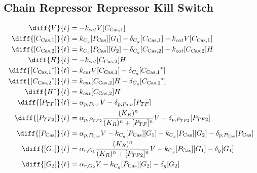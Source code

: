 \subsection{Chain Repressor Repressor Kill Switch}
\label{s:Chain_Repressor_Repressor_Kill_Switch}

\begin{align}
\diff{\vectorGen{}}{t} & = - \casCutRate{{}}\vectorGen{}\conc{\cplx{\cas}{1}}\\
\diff{\conc{\cplx{\cas}{1}}}{t} & =  \gRnaBind{}\conc{\proSp{\cas{}}}\conc{\gRna{1}} - \casCompDegradeRate{}\conc{\cplx{\cas}{1}} - \casCutRate{{}}\vectorGen{}\conc{\cplx{\cas}{1}}\\
\diff{\conc{\cplx{\cas}{2}}}{t} & =  \gRnaBind{}\conc{\proSp{\cas{}}}\conc{\gRna{2}} - \casCompDegradeRate{}\conc{\cplx{\cas}{2}} - \casCutRate{{}}\conc{\cplx{\cas}{2}}\hostGen{}\\
\diff{\hostGen{}}{t} & = - \casCutRate{{}}\conc{\cplx{\cas}{2}}\hostGen{}\\
\diff{\conc{\bound{\cplx{\cas}{1}}}}{t} & =  \casCutRate{{}}\vectorGen{}\conc{\cplx{\cas}{1}} - \casCompDegradeRate{}\conc{\bound{\cplx{\cas}{1}}}\\
\diff{\conc{\bound{\cplx{\cas}{2}}}}{t} & =  \casCutRate{{}}\conc{\cplx{\cas}{2}}\hostGen{} - \casCompDegradeRate{}\conc{\bound{\cplx{\cas}{2}}}\\
\diff{\edited{\hostGen{}}}{t} & =  \casCutRate{{}}\conc{\cplx{\cas}{2}}\hostGen{}\\
\diff{\conc{\proSp{TF}}}{t} & =  \txtlRate{\proSp{TF}}\vectorGen{} - \proDegradeRate{\proSp{TF}}\conc{\proSp{TF}}\\
\diff{\conc{\proSp{TF2}}}{t} & =  \txtlRate{\proSp{TF2}}\frac{(K_R)^n}{(K_R)^n + \conc{\proSp{TF}}^n}\vectorGen{} - \proDegradeRate{\proSp{TF2}}\conc{\proSp{TF2}}\\
\diff{\conc{\proSp{\cas{}}}}{t} & =  \txtlRate{\proSp{\cas{}}}\vectorGen{} - \gRnaBind{}\conc{\proSp{\cas{}}}\conc{\gRna{1}} - \gRnaBind{}\conc{\proSp{\cas{}}}\conc{\gRna{2}} - \proDegradeRate{\proSp{\cas{}}}\conc{\proSp{\cas{}}}\\
\diff{\conc{\gRna{1}}}{t} & =  \txRate{\gRna{1}}\frac{(K_R)^n}{(K_R)^n + \conc{\proSp{TF2}}^n}\vectorGen{} - \gRnaBind{}\conc{\proSp{\cas{}}}\conc{\gRna{1}} - \rnaDegradeRate{}\conc{\gRna{1}}\\
\diff{\conc{\gRna{2}}}{t} & =  \txRate{\gRna{2}}\vectorGen{} - \gRnaBind{}\conc{\proSp{\cas{}}}\conc{\gRna{2}} - \rnaDegradeRate{}\conc{\gRna{2}}
\end{align}


